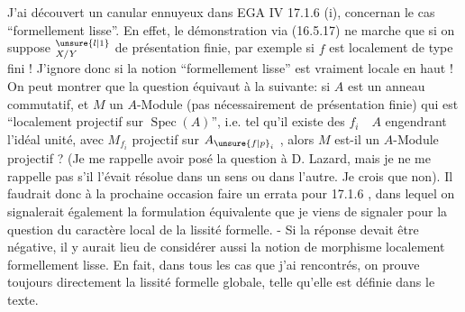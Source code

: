 
J'ai découvert un canular ennuyeux dans EGA IV 17.1.6 (i), concernan le cas ``formellement lisse''. En effet, le démonstration via (16.5.17) ne marche que si on suppose ${}^{\unsure{l|1}}_{X/Y}$ de présentation finie, par exemple si $f$ est localement de  type fini ! J'ignore donc si la notion ``formellement lisse'' est vraiment locale en haut ! On peut montrer que la question équivaut à la suivante: si $A$ est un anneau commutatif, et $M$ un $A$-Module (pas nécessairement de présentation finie) qui est ``localement projectif sur $\operatorname{Spec}(A)$'', i.e. tel qu'il existe des $f_i\quad A$ engendrant l'idéal unité, avec $M_{f_i}$ projectif sur $A_{\unsure{f|p}_i}$ , alors $M$ est-il un $A$-Module projectif ? (Je me rappelle avoir posé la question à D. Lazard, mais je ne me rappelle pas s'il l'évait résolue dans un sens ou dans l'autre. Je crois que non). Il faudrait donc à la prochaine occasion faire un errata pour 17.1.6 , dans lequel on  signalerait également la formulation équivalente que je viens de signaler pour la question du caractère local de la lissité formelle. - Si la réponse devait être négative, il y aurait lieu de considérer aussi la notion de morphisme localement formellement lisse. En fait, dans tous les cas que j'ai rencontrés,  on prouve toujours directement la lissité formelle globale, telle qu'elle est définie dans le texte.

